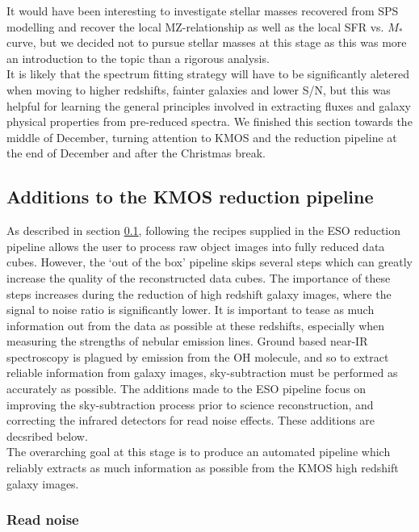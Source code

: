 \documentclass{literature}
\begin{document}
It would have been interesting to investigate stellar masses recovered from SPS modelling and recover the local MZ-relationship as well as the local SFR vs. $M_{*}$ curve, but we decided not to pursue stellar masses at this stage as this was more an introduction to the topic than a rigorous analysis. \\ 

It is likely that the  spectrum fitting strategy will have to be significantly aletered when moving to higher redshifts, fainter galaxies and lower S/N, but this was helpful for learning the general principles involved in extracting fluxes and galaxy physical properties from pre-reduced spectra. We finished this section towards the middle of December, turning attention to KMOS and the reduction pipeline at the end of December and after the Christmas break.   

\subsection{Additions to the KMOS reduction pipeline}\label{subsec:kmos_pipeline}

As described in section \ref{subsec:kmos_pipeline}, following the recipes supplied in the ESO reduction pipeline allows the user to process raw object images into fully reduced data cubes. However, the `out of the box' pipeline skips several steps which can greatly increase the quality of the reconstructed data cubes. The importance of these steps increases during the reduction of high redshift galaxy images, where the signal to noise ratio is significantly lower. It is important to tease as much information out from the data as possible at these redshifts, especially when measuring the strengths of nebular emission lines. Ground based near-IR spectroscopy is plagued by emission from the OH molecule, and so to extract reliable information from galaxy images, sky-subtraction must be performed as accurately as possible. The additions made to the ESO pipeline focus on improving the sky-subtraction process prior to science reconstruction, and correcting the infrared detectors for read noise effects. These additions are decsribed below.  \\ 
The overarching goal at this stage is to produce an automated pipeline which reliably extracts as much information as possible from the KMOS high redshift galaxy images. 

\subsubsection{Read noise}
\end{document}
